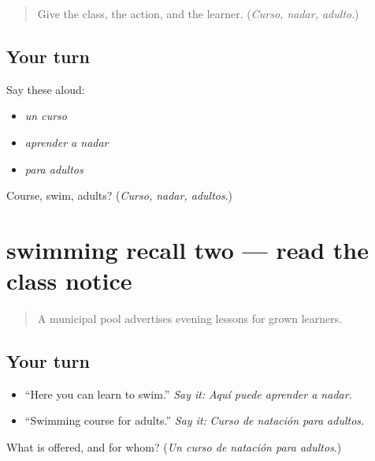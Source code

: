 \label{lesson:ES-C417-swimming-recall-1}



\begin{quote}
Give the class, the action, and the learner. (\emph{Curso, nadar, adulto}.)
\end{quote}

\subsection*{Your turn}
Say these aloud:

\begin{itemize}
\raggedright
  \item \emph{un curso}
  \item \emph{aprender a nadar}
  \item \emph{para adultos}
\end{itemize}

\begin{tcolorbox}[breakable,colback=teal!4,colframe=teal!35!black,title={Before you move on}]
Course, swim, adults? (\emph{Curso, nadar, adultos}.)
\end{tcolorbox}
\section[(review)]{swimming recall two — read the class notice}

\label{lesson:ES-C417-swimming-recall-2}



\begin{quote}
A municipal pool advertises evening lessons for grown learners.
\end{quote}

\subsection*{Your turn}
\begin{itemize}
\raggedright
  \item “Here you can learn to swim.” \emph{Say it:} \emph{Aquí puede aprender a nadar.}
  \item “Swimming course for adults.” \emph{Say it:} \emph{Curso de natación para adultos.}
\end{itemize}

\begin{tcolorbox}[breakable,colback=teal!4,colframe=teal!35!black,title={Before you move on}]
What is offered, and for whom? (\emph{Un curso de natación para adultos}.)
\end{tcolorbox}
